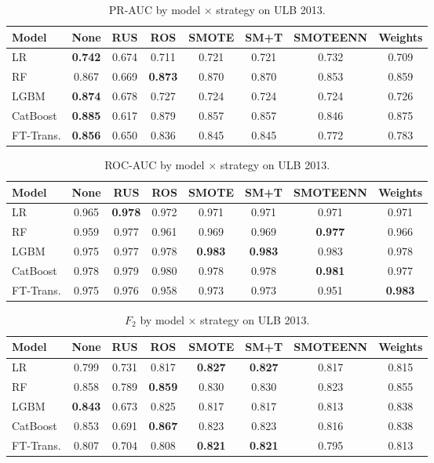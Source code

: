\begin{table}[ht!]
\centering
\caption{PR-AUC by model $\times$ strategy on ULB 2013.}
\label{tab:factorial_ulb_prauc}
\begin{tabular}{l c c c c c c c}
\toprule
Model & None & RUS & ROS & SMOTE & SM+T & SMOTEENN & Weights \\
\midrule
LR         & \textbf{0.742} & 0.674 & 0.711 & 0.721 & 0.721 & 0.732 & 0.709 \\
RF         & 0.867 & 0.669 & \textbf{0.873} & 0.870 & 0.870 & 0.853 & 0.859 \\
LGBM       & \textbf{0.874} & 0.678 & 0.727 & 0.724 & 0.724 & 0.724 & 0.726 \\
CatBoost   & \textbf{0.885} & 0.617 & 0.879 & 0.857 & 0.857 & 0.846 & 0.875 \\
FT-Trans.  & \textbf{0.856} & 0.650 & 0.836 & 0.845 & 0.845 & 0.772 & 0.783 \\
\bottomrule
\end{tabular}
\end{table}

\begin{table}[ht!]
\centering
\caption{ROC-AUC by model $\times$ strategy on ULB 2013.}
\label{tab:factorial_ulb_rocauc}
\begin{tabular}{l c c c c c c c}
\toprule
Model & None & RUS & ROS & SMOTE & SM+T & SMOTEENN & Weights \\
\midrule
LR         & 0.965 & \textbf{0.978} & 0.972 & 0.971 & 0.971 & 0.971 & 0.971 \\
RF         & 0.959 & 0.977 & 0.961 & 0.969 & 0.969 & \textbf{0.977} & 0.966 \\
LGBM       & 0.975 & 0.977 & 0.978 & \textbf{0.983} & \textbf{0.983} & 0.983 & 0.978 \\
CatBoost   & 0.978 & 0.979 & 0.980 & 0.978 & 0.978 & \textbf{0.981} & 0.977 \\
FT-Trans.  & 0.975 & 0.976 & 0.958 & 0.973 & 0.973 & 0.951 & \textbf{0.983} \\
\bottomrule
\end{tabular}
\end{table}

\begin{table}[ht!]
\centering
\caption{$F_2$ by model $\times$ strategy on ULB 2013.}
\label{tab:factorial_ulb_f2}
\begin{tabular}{l c c c c c c c}
\toprule
Model & None & RUS & ROS & SMOTE & SM+T & SMOTEENN & Weights \\
\midrule
LR         & 0.799 & 0.731 & 0.817 & \textbf{0.827} & \textbf{0.827} & 0.817 & 0.815 \\
RF         & 0.858 & 0.789 & \textbf{0.859} & 0.830 & 0.830 & 0.823 & 0.855 \\
LGBM       & \textbf{0.843} & 0.673 & 0.825 & 0.817 & 0.817 & 0.813 & 0.838 \\
CatBoost   & 0.853 & 0.691 & \textbf{0.867} & 0.823 & 0.823 & 0.816 & 0.838 \\
FT-Trans.  & 0.807 & 0.704 & 0.808 & \textbf{0.821} & \textbf{0.821} & 0.795 & 0.813 \\
\bottomrule
\end{tabular}
\end{table}

